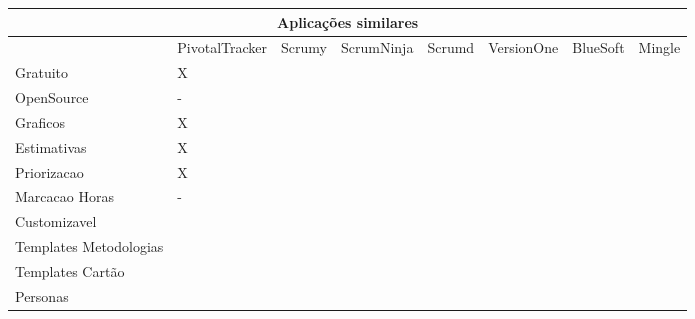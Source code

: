 \begin{table}
	\begin{tabular}{|l|l|l|l|l|l|l|l}
		\hline
		\multicolumn{8}{|c|}{Aplicações similares} \\
		\hline
		 & PivotalTracker & Scrumy & ScrumNinja & Scrumd & VersionOne & BlueSoft & Mingle \\
		Gratuito & X & & & & & & \\
		OpenSource & - & & & & & & \\
		Graficos & X & & & & & & \\
		Estimativas & X & & & & & & \\
		Priorizacao & X & & & & & & \\
		Marcacao Horas & - & & & & & & \\
		Customizavel & & & & & & & \\
		Templates Metodologias & & & & & & & \\
		Templates Cartão & & & & & & & \\
		Personas & & & & & & & \\
		\hline
	\end{tabular}
\end{table}


